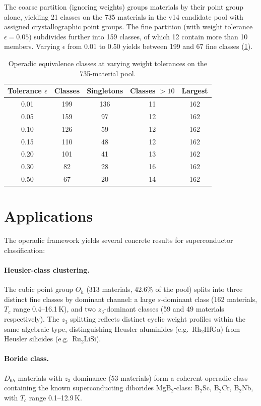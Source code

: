 \documentclass[11pt,a4paper]{article}
\begin{document}
The coarse partition (ignoring weights) groups materials by their
point group alone, yielding 21 classes on the 735 materials in the
v14 candidate pool with assigned crystallographic point groups.
The fine partition (with weight tolerance $\epsilon = 0.05$)
subdivides further into 159 classes, of which 12 contain more
than 10 members. Varying $\epsilon$ from 0.01 to 0.50 yields
between 199 and 67 fine classes (\cref{tab:tol-scan}).

\begin{table}[h]
\centering
\begin{tabular}{ccccc}
\toprule
Tolerance $\epsilon$ & Classes & Singletons &
  Classes $>10$ & Largest \\
\midrule
0.01 & 199 & 136 & 11 & 162 \\
0.05 & 159 & 97  & 12 & 162 \\
0.10 & 126 & 59  & 12 & 162 \\
0.15 & 110 & 48  & 12 & 162 \\
0.20 & 101 & 41  & 13 & 162 \\
0.30 & 82  & 28  & 16 & 162 \\
0.50 & 67  & 20  & 14 & 162 \\
\bottomrule
\end{tabular}
\caption{Operadic equivalence classes at varying weight tolerances
  on the 735-material pool.}\label{tab:tol-scan}
\end{table}

\section{Applications}\label{sec:applications}

The operadic framework yields several concrete results for
superconductor classification:

\paragraph{Heusler-class clustering.}
The cubic point group $O_h$ (313 materials, 42.6\% of the pool)
splits into three distinct fine classes by dominant channel:
a large $s$-dominant class (162 materials, $T_c$ range 0.4--16.1\,K),
and two $z_3$-dominant classes (59 and 49 materials respectively).
The $z_3$ splitting reflects distinct cyclic weight profiles within
the same algebraic type, distinguishing Heusler aluminides (e.g.\
Rh$_2$HfGa) from Heusler silicides (e.g.\ Ru$_2$LiSi).

\paragraph{Boride class.}
$D_{6h}$ materials with $z_3$ dominance (53 materials) form a
coherent operadic class containing the known superconducting
diborides MgB$_2$-class: B$_2$Sc, B$_2$Cr, B$_2$Nb, with
$T_c$ range 0.1--12.9\,K.
\end{document}
